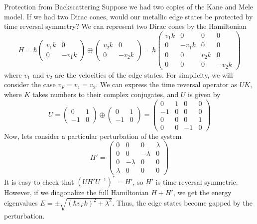 \documentclass[a4paper,12pt]{article}
\begin{document}
\begin{section}{Protection from Backscattering}
Suppose we had two copies of the Kane and Mele model.  If we had two Dirac cones, would our metallic edge states be protected by time reversal symmetry?  We can represent two Dirac cones by the Hamiltonian
\begin{equation}
H=
\hbar \left(
\begin{array}{cc}
v_1 k & 0  \\
0 & -v_1 k
\end{array}
\right)
\oplus
\left(
\begin{array}{cc}
v_2 k & 0  \\
0 & -v_2 k
\end{array}
\right)
=\hbar \left(
\begin{array}{cccc}
v_1 k & 0 & 0 & 0 \\
0 & -v_1 k & 0 & 0 \\
0 & 0 & v_2 k & 0 \\
0 & 0 & 0 & -v_2 k
\end{array}
\right)
\end{equation}
where $v_1$ and $v_2$ are the velocities of the edge states.  For simplicity, we will consider the case $v_F=v_1=v_2$.  We can express the time reversal operator as $UK$, where $K$ takes numbers to their complex conjugates, and $U$ is given by
\begin{equation}
U=
\left(
\begin{array}{cc}
0 & 1  \\
-1 & 0
\end{array}
\right)
\oplus
\left(
\begin{array}{cc}
0 & 1  \\
-1 & 0
\end{array}
\right)
=\left(
\begin{array}{cccc}
0 & 1 & 0 & 0\\
-1 & 0 & 0 & 0 \\
0 & 0 & 0 & 1 \\
0 & 0 & -1 & 0
\end{array}
\right)
\end{equation}
Now, lets consider a particular perturbation of the system
\begin{equation}
H'
=\left(
\begin{array}{cccc}
0 & 0 & 0 & \lambda \\
0 & 0 & -\lambda & 0 \\
0 & -\lambda & 0 & 0 \\
\lambda & 0 & 0 & 0
\end{array}
\right)
\end{equation}
It is easy to check that $(UH'U^{-1})^*=H'$, so $H'$ is time reversal symmetric.  However, if we diagonalize the full Hamiltonian $H+H'$, we get the energy eigenvalues $E=\pm \sqrt{(\hbar v_F k)^2+\lambda^2}$.  Thus, the edge states become gapped by the perturbation.


\end{section}
\end{document}
